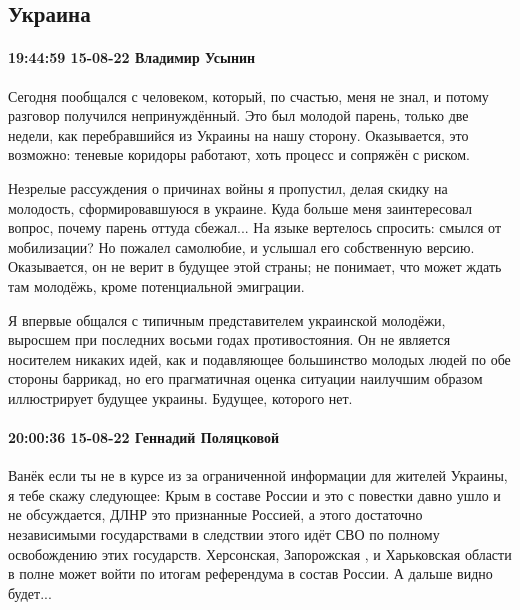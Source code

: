  
 
 
 
 


\subsection{Украина}

\paragraph{19:44:59 15-08-22 Владимир Усынин}

Сегодня пообщался с человеком, который, по счастью, меня не знал, и потому
разговор получился непринуждённый. Это был молодой парень, только две недели,
как перебравшийся из Украины на нашу сторону. Оказывается, это возможно:
теневые коридоры работают, хоть процесс и сопряжён с риском.

Незрелые рассуждения о причинах войны я пропустил, делая скидку на молодость,
сформировавшуюся в украине. Куда больше меня заинтересовал вопрос, почему
парень оттуда сбежал... На языке вертелось спросить: смылся от мобилизации? Но
пожалел самолюбие, и услышал его собственную версию. Оказывается, он не верит в
будущее этой страны; не понимает, что может ждать там молодёжь, кроме
потенциальной эмиграции.

Я впервые общался с типичным представителем украинской молодёжи, выросшем при
последних восьми годах противостояния. Он не является носителем никаких идей,
как и подавляющее большинство молодых людей по обе стороны баррикад, но его
прагматичная оценка ситуации наилучшим образом иллюстрирует будущее украины.
Будущее, которого нет.

\paragraph{20:00:36 15-08-22 Геннадий Поляцковой}

Ванёк если ты не в курсе из за ограниченной информации для жителей Украины, я
тебе скажу следующее: Крым в составе России и это с повестки давно ушло и не
обсуждается, ДЛНР это признанные Россией, а этого достаточно независимыми
государствами в следствии этого идёт СВО по полному освобождению этих
государств. Херсонская, Запорожская , и Харьковская области в полне может войти
по итогам референдума в состав России. А дальше видно будет...

